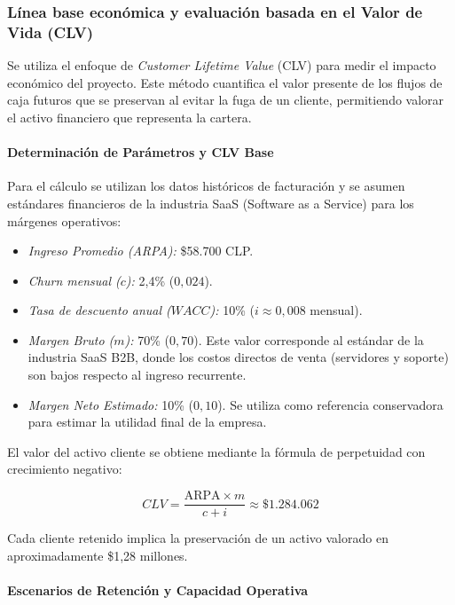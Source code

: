 \subsubsection{Línea base económica y evaluación basada en el Valor de Vida (CLV)}

Se utiliza el enfoque de \textit{Customer Lifetime Value} (CLV) para medir el impacto económico del proyecto. Este método cuantifica el valor presente de los flujos de caja futuros que se preservan al evitar la fuga de un cliente, permitiendo valorar el activo financiero que representa la cartera.

\paragraph{Determinación de Parámetros y CLV Base}

Para el cálculo se utilizan los datos históricos de facturación y se asumen estándares financieros de la industria SaaS (Software as a Service) para los márgenes operativos:

\begin{itemize}
    \item \textit{Ingreso Promedio (ARPA):} \$58.700 CLP.
    \item \textit{Churn mensual ($c$):} 2,4\% ($0{,}024$).
    \item \textit{Tasa de descuento anual ($WACC$):} 10\% ($i \approx 0{,}008$ mensual).
    \item \textit{Margen Bruto ($m$):} 70\% ($0{,}70$). Este valor corresponde al estándar de la industria SaaS B2B, donde los costos directos de venta (servidores y soporte) son bajos respecto al ingreso recurrente.
    \item \textit{Margen Neto Estimado:} 10\% ($0{,}10$). Se utiliza como referencia conservadora para estimar la utilidad final de la empresa.
\end{itemize}

El valor del activo cliente se obtiene mediante la fórmula de perpetuidad con crecimiento negativo:

\begin{equation}
    CLV = \frac{\text{ARPA} \times m}{c + i} \approx \$1.284.062
\end{equation}

Cada cliente retenido implica la preservación de un activo valorado en aproximadamente \$1,28 millones.

\paragraph{Escenarios de Retención y Capacidad Operativa}

